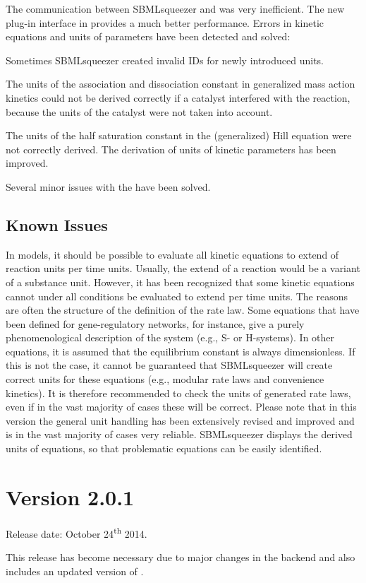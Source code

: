 The communication between SBMLsqueezer and \CellDesigner was very inefficient.
The new plug-in interface in \JSBML provides a much better performance.
Errors in kinetic equations and units of parameters have been detected and
solved:
\begin{dinglist}{54}
\item Sometimes SBMLsqueezer created invalid \acp{ID} for newly introduced
      units.
\item The units of the association and dissociation constant in generalized mass
      action kinetics could not be derived correctly if a catalyst interfered
      with the reaction, because the units of the catalyst were not taken into
      account.
\item The units of the half saturation constant in the (generalized) Hill
      equation were not correctly derived. The derivation of units of kinetic
      parameters has been improved.
\end{dinglist}  
Several minor issues with the \GUI have been solved.

\subsection{Known Issues}

In \SBML models, it should be possible to evaluate all kinetic equations to
extend of reaction units per time units. Usually, the extend of a reaction would
be a variant of a substance unit. However, it has been recognized that some
kinetic equations cannot under all conditions be evaluated to extend per time
units. The reasons are often the structure of the definition of the rate law.
Some equations that have been defined for gene-regulatory networks, for
instance, give a purely phenomenological description of the system (e.g.,
S- or H-systems). In other equations, it is assumed that the equilibrium constant
is always dimensionless. If this is not the case, it cannot be guaranteed that
SBMLsqueezer will create correct units for these equations (e.g., modular rate
laws and convenience kinetics). It is therefore recommended to check the units
of generated rate laws, even if in the vast majority of cases these will be
correct. Please note that in this version the general unit handling has been
extensively revised and improved and is in the vast majority of cases very
reliable. SBMLsqueezer displays the derived units of equations, so that
problematic equations can be easily identified.

\section{Version 2.0.1}

Release date: October 24\textsuperscript{th} 2014.

This release has become necessary due to major changes in the \Garuda backend and also includes an updated version of \JSBML.


